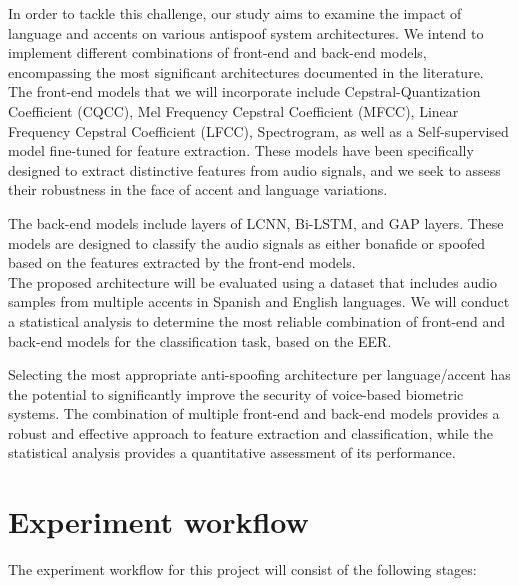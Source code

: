 In order to tackle this challenge, our study aims to examine the impact of language and accents on various antispoof system architectures. We intend to implement different combinations of front-end and back-end models, encompassing the most significant architectures documented in the literature. The front-end models that we will incorporate include Cepstral-Quantization Coefficient (CQCC), Mel Frequency Cepstral Coefficient (MFCC), Linear Frequency Cepstral Coefficient (LFCC), Spectrogram, as well as a Self-supervised model fine-tuned for feature extraction. These models have been specifically designed to extract distinctive features from audio signals, and we seek to assess their robustness in the face of accent and language variations.


The back-end models include layers of \acs{LCNN}, \acs{Bi-LSTM}, and \acs{GAP} layers. These models are designed to classify the audio signals as either bonafide or spoofed based on the features extracted by the front-end models.\\

The proposed architecture will be evaluated using a dataset that includes audio samples from multiple accents in Spanish and English languages. We will conduct a statistical analysis to determine the most reliable combination of front-end and back-end models for the classification task, based on the \acs{EER}.

Selecting the most appropriate anti-spoofing architecture per language/accent has the potential to significantly improve the security of voice-based biometric systems. The combination of multiple front-end and back-end models provides a robust and effective approach to feature extraction and classification, while the statistical analysis provides a quantitative assessment of its performance.

\section{Experiment workflow}

The experiment workflow for this project will consist of the following stages:

